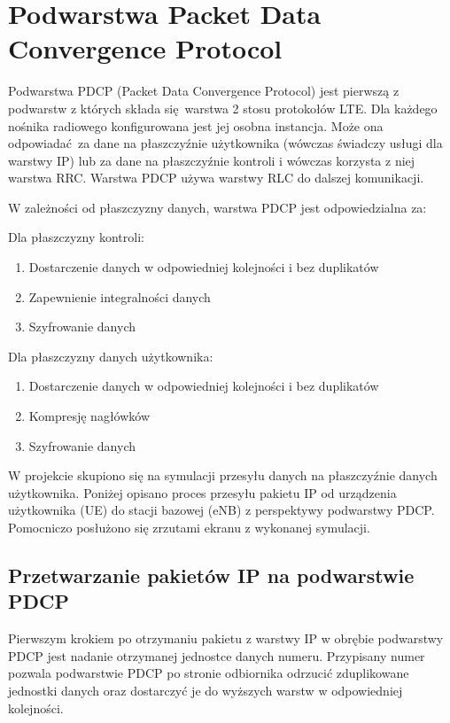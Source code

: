 \chapter{Podwarstwa Packet Data Convergence Protocol}
\label{cha:pdcp}

Podwarstwa PDCP (Packet Data Convergence Protocol) jest pierwszą z podwarstw z których składa się warstwa 2 stosu protokołów LTE. Dla każdego nośnika radiowego konfigurowana jest jej osobna instancja. Może ona odpowiadać za dane na płaszczyźnie użytkownika (wówczas świadczy usługi dla warstwy IP) lub za dane na płaszczyźnie kontroli i wówczas korzysta z niej warstwa RRC. Warstwa PDCP używa warstwy RLC do dalszej komunikacji.

W zależności od płaszczyzny danych, warstwa PDCP jest odpowiedzialna za:

Dla płaszczyzny kontroli:
\begin{enumerate}
	\item Dostarczenie danych w odpowiedniej kolejności i bez duplikatów
	\item Zapewnienie integralności danych
	\item Szyfrowanie danych
\end{enumerate}

Dla płaszczyzny danych użytkownika:
\begin{enumerate}
	\item Dostarczenie danych w odpowiedniej kolejności i bez duplikatów
	\item Kompresję nagłówków
	\item Szyfrowanie danych
\end{enumerate}

W projekcie skupiono się na symulacji przesyłu danych na płaszczyźnie danych użytkownika. Poniżej opisano proces przesyłu pakietu IP od urządzenia użytkownika (UE) do stacji bazowej (eNB) z perspektywy podwarstwy PDCP. Pomocniczo posłużono się zrzutami ekranu z wykonanej symulacji.

\section{Przetwarzanie pakietów IP na podwarstwie PDCP}

Pierwszym krokiem po otrzymaniu pakietu z warstwy IP w obrębie podwarstwy PDCP jest nadanie otrzymanej jednostce danych numeru. Przypisany numer pozwala podwarstwie PDCP po stronie odbiornika odrzucić zduplikowane jednostki danych oraz dostarczyć je do wyższych warstw w odpowiedniej kolejności.

